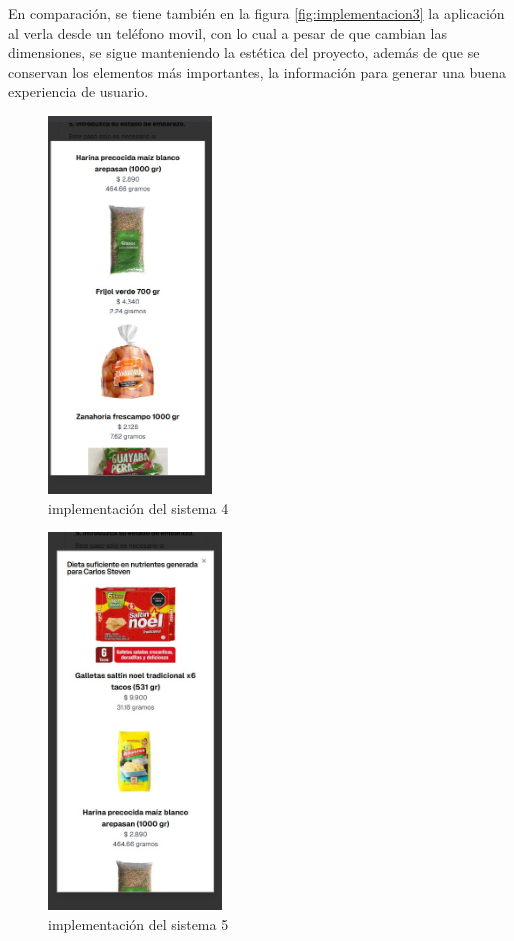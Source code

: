 En comparaci\'on, se tiene tambi\'en en la figura \ref{fig:implementacion3} la aplicaci\'on al verla desde un tel\'efono movil, con lo cual a pesar de que cambian las dimensiones, se sigue manteniendo la est\'etica del proyecto, adem\'as de que se conservan los elementos m\'as importantes, la informaci\'on para generar una buena experiencia de usuario.

\begin{figure}[H]
    \centering
    \includegraphics[height=10cm]{img/implementacion/implementacion2.jpeg}
    \caption{implementaci\'on del sistema 4}
    \label{fig:implementacion4}
\end{figure}

\begin{figure}[H]
    \centering
    \includegraphics[height=10cm]{img/implementacion/implementacion3.jpeg}
    \caption{implementaci\'on del sistema 5}
    \label{fig:implementacion5}
\end{figure}


